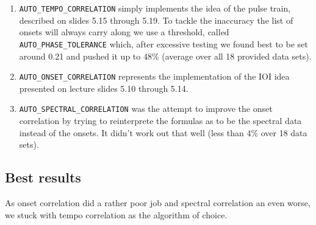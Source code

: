 \begin{enumerate}
  \item \texttt{AUTO\_TEMPO\_CORRELATION} simply implements the idea of the
  pulse train, described on slides 5.15 through 5.19. To tackle the inaccuracy the
  list of onsets will always carry along we use a threshold, called
  \texttt{AUTO\_PHASE\_TOLERANCE} which, after excessive testing we found best
  to be set around 0.21 and pushed it up to 48\% (average over all 18 provided data
  sets).
  \item \texttt{AUTO\_ONSET\_CORRELATION} represents the implementation of the
  IOI idea presented on lecture slides 5.10 through 5.14.
  \item \texttt{AUTO\_SPECTRAL\_CORRELATION} was the attempt to improve the
  onset correlation by trying to reinterprete the formulas as to be the spectral data
  instead of the onsets. It didn't work out that well (less than 4\% over 18
  data sets).
\end{enumerate}

\subsection{Best results}
As onset correlation did a rather poor job and spectral correlation an even
worse, we stuck with tempo correlation as the algorithm of choice.
